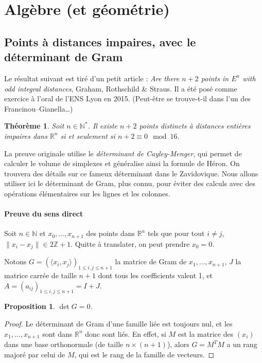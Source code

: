 \documentclass[a4paper, 11pt]{article}
\def\Z{\mathbb{Z}}
\def\N{\mathbb{N}}
\def\R{\mathbb{R}}
\newtheorem*{proposition}{Proposition}
\newtheorem*{theorem}{Théorème}
\begin{document}
\newpage

\section{Algèbre (et géométrie)}

\subsection{Points à distances impaires, avec le déterminant de Gram}

Le résultat suivant est tiré d'un petit article : \emph{Are there $n+2$ points
  in $E^n$ with odd integral distances}, Graham, Rothschild \& Straus. Il a été
posé comme exercice à l'oral de l'ENS Lyon en 2015. (Peut-être se trouve-t-il
dans l'un des Francinou--Gianella…)
\begin{theorem}
  Soit $n \in \N^*$. Il existe $n+2$ points distincts à distances entières
  impaires dans $\R^n$ si et seulement si $n+2 \equiv 0 \mod 16$.
\end{theorem}

La preuve originale utilise le \emph{déterminant de Cayley-Menger}, qui permet
de calculer le volume de simplexes et généralise ainsi la formule de Héron. On
trouvera des détails sur ce fameux déterminant dans le Zavidovique. Nous allons
utiliser ici le déterminant de Gram, plus connu, pour éviter des calculs avec
des opérations élémentaires sur les lignes et les colonnes.

\paragraph{Preuve du sens direct}

Soit $n \in \N$ et $x_0, \ldots, x_{n+1}$ des points dans $\R^n$ tels que pour
tout $i \neq j$, $\|x_i - x_j\| \in 2\Z + 1$. Quitte à translater, on peut
prendre $x_0 = 0$.

Notons $G = (\langle x_i, x_j \rangle)_{1 \leq i,j \leq n+1}$ la matrice de Gram
de $x_1, \ldots, x_{n+1}$, $J$ la matrice carrée de taille $n+1$ dont tous les
coefficients valent 1, et $A = (a_{ij})_{1 \leq i,j \leq n+1} = I+J$.

\begin{proposition}
  $\det G = 0$.
\end{proposition}
\begin{proof}
  Le déterminant de Gram d'une famille liée est toujours nul, et les $x_1,
  \ldots, x_{n+1}$ sont dans $\R^n$ donc sont liés. En effet, si $M$ est la
  matrice des $(x_i)$ dans une base orthonormale (de taille $n \times (n+1)$),
  alors $G = M^T M$ a un rang majoré par celui de $M$, qui est le rang de la
  famille de vecteurs.
\end{proof}
\end{document}
